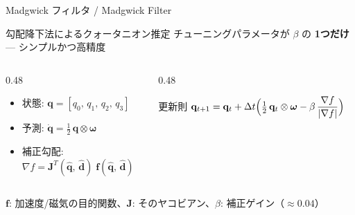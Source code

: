 \documentclass[aspectratio=169, 14pt]{beamer}
\begin{document}
\begin{frame}{Madgwick フィルタ / Madgwick Filter}
  \begin{block}{勾配降下法によるクォータニオン推定}
    チューニングパラメータが $\beta$ の \textbf{1つだけ} --- シンプルかつ高精度
  \end{block}

  \vspace{0.3em}

  \begin{columns}[c]
    \begin{column}{0.48\textwidth}
      {\small
      \begin{itemize}
        \item 状態: $\mathbf{q} = [q_0,\, q_1,\, q_2,\, q_3]$
        \item 予測: $\dot{\mathbf{q}} = \tfrac{1}{2}\,\mathbf{q} \otimes \boldsymbol{\omega}$
        \item 補正勾配:\\[2pt]
              $\nabla f = \mathbf{J}^T(\hat{\mathbf{q}},\,\hat{\mathbf{d}})\;\mathbf{f}(\hat{\mathbf{q}},\,\hat{\mathbf{d}})$
      \end{itemize}
      }
    \end{column}
    \begin{column}{0.48\textwidth}
      \begin{alertblock}{更新則}
        $\mathbf{q}_{t+1} = \mathbf{q}_t + \Delta t\Bigl(\tfrac{1}{2}\,\mathbf{q}_t \otimes \boldsymbol{\omega} - \beta\,\dfrac{\nabla f}{|\nabla f|}\Bigr)$
      \end{alertblock}
    \end{column}
  \end{columns}

  \vspace{0.3em}
  {\footnotesize $\mathbf{f}$: 加速度/磁気の目的関数、$\mathbf{J}$: そのヤコビアン、$\beta$: 補正ゲイン（$\approx 0.04$）}
\end{frame}
\end{document}
